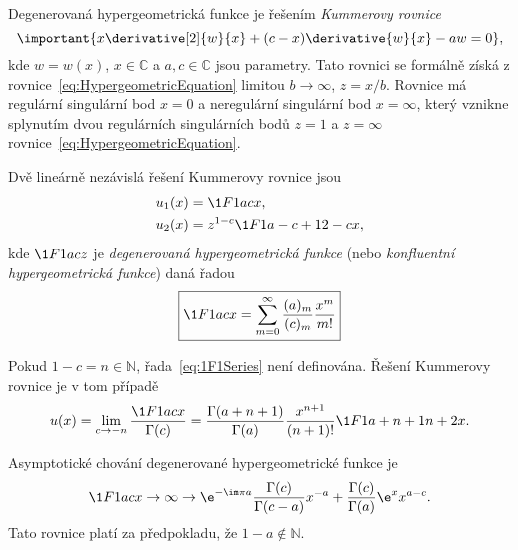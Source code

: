 Degenerovaná hypergeometrická funkce je řešením \emph{Kummerovy rovnice}
\begin{equation}
    \important{
        x\derivative[2]{w}{x}+(c-x)\derivative{w}{x}-aw=0
    },
\end{equation}
kde $w=w(x)$, $x\in\mathbb{C}$ a $a,c\in\mathbb{C}$ jsou parametry.
Tato rovnici se formálně získá z rovnice~\eqref{eq:HypergeometricEquation} limitou $b\rightarrow\infty$, $z=x/b$. 
Rovnice má regulární singulární bod $x=0$ a neregulární singulární bod $x=\infty$, který vznikne splynutím dvou regulárních singulárních bodů $z=1$ a $z=\infty$ rovnice~\eqref{eq:HypergeometricEquation}.

Dvě lineárně nezávislá řešení Kummerovy rovnice jsou
\begin{subequations}
    \begin{align}
        u_{1}(x)
            &=\1F1{a}{c}{x},\\
        u_{2}(x)
            &=z^{1-c}\1F1{a-c+1}{2-c}{x},
    \end{align}
\end{subequations}
kde $\1F1{a}{c}{z}$ je \emph{degenerovaná hypergeometrická funkce} (nebo \emph{konfluentní hypergeometrická funkce}) daná řadou
\begin{equation}
    \label{eq:1F1Series}
    \boxed{
        \1F1{a}{c}{x}=\sum_{m=0}^{\infty}\frac{(a)_{m}}{(c)_{m}}\frac{x^{m}}{m!}
    }
\end{equation}

Pokud $1-c=n\in\mathbb{N}$, řada~\eqref{eq:1F1Series} není definována.
Řešení Kummerovy rovnice je v tom případě
\begin{equation}
    u(x)
        =\lim_{c\rightarrow-n}\frac{\1F1{a}{c}{x}}{\Gamma(c)}
        =\frac{\Gamma(a+n+1)}{\Gamma(a)}\frac{x^{n+1}}{(n+1)!}\1F1{a+n+1}{n+2}{x}.
\end{equation}

Asymptotické chování degenerované hypergeometrické funkce je
\begin{equation}
    \1F1{a}{c}{x\rightarrow\infty}
        \rightarrow\e^{-\im\pi a}\frac{\Gamma(c)}{\Gamma(c-a)}x^{-a}
            +\frac{\Gamma(c)}{\Gamma(a)}\e^{x}x^{a-c}.
\end{equation}
Tato rovnice platí za předpokladu, že $1-a\notin\mathbb{N}$.
